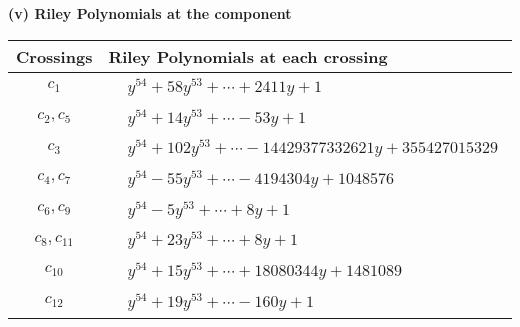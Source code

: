 \documentclass[1p]{elsarticle_modified}
\theoremstyle{definition}
\begin{document}
\newpage\renewcommand{\arraystretch}{1}
\flushleft \textbf{(v) Riley Polynomials at the component}\newline \\
\begin{tabular}{m{50pt}|m{274pt}}
Crossings & \hspace{64pt}Riley Polynomials at each crossing \\
\hline $$\begin{aligned}c_{1}\end{aligned}$$&$\begin{aligned}
&y^{54}+58 y^{53}+\cdots+2411 y+1
\end{aligned}$\\
\hline $$\begin{aligned}c_{2},c_{5}\end{aligned}$$&$\begin{aligned}
&y^{54}+14 y^{53}+\cdots-53 y+1
\end{aligned}$\\
\hline $$\begin{aligned}c_{3}\end{aligned}$$&$\begin{aligned}
&y^{54}+102 y^{53}+\cdots-14429377332621 y+355427015329
\end{aligned}$\\
\hline $$\begin{aligned}c_{4},c_{7}\end{aligned}$$&$\begin{aligned}
&y^{54}-55 y^{53}+\cdots-4194304 y+1048576
\end{aligned}$\\
\hline $$\begin{aligned}c_{6},c_{9}\end{aligned}$$&$\begin{aligned}
&y^{54}-5 y^{53}+\cdots+8 y+1
\end{aligned}$\\
\hline $$\begin{aligned}c_{8},c_{11}\end{aligned}$$&$\begin{aligned}
&y^{54}+23 y^{53}+\cdots+8 y+1
\end{aligned}$\\
\hline $$\begin{aligned}c_{10}\end{aligned}$$&$\begin{aligned}
&y^{54}+15 y^{53}+\cdots+18080344 y+1481089
\end{aligned}$\\
\hline $$\begin{aligned}c_{12}\end{aligned}$$&$\begin{aligned}
&y^{54}+19 y^{53}+\cdots-160 y+1
\end{aligned}$\\
\hline
\end{tabular}\\~\\
\end{document}
